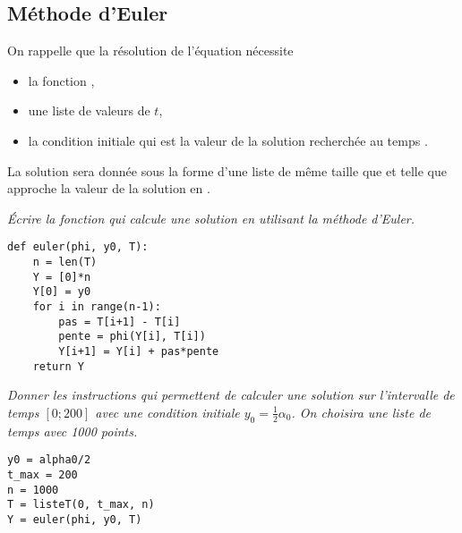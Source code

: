 \subsection{Méthode d'Euler} 
On rappelle que la résolution de l'équation nécessite
\begin{itemize}
    \item la fonction ,
    \item une liste  de valeurs de $t$,
    \item la condition initiale  qui est la valeur de la solution recherchée au temps .
\end{itemize}
La solution sera donnée sous la forme d'une liste  de même taille que  et telle que  approche la valeur de la solution en .
\begin{Exercise}\it
Écrire la fonction  qui calcule une solution en utilisant la méthode d'Euler.
\end{Exercise}
\begin{Answer}
\begin{lstlisting}
def euler(phi, y0, T):
    n = len(T)
    Y = [0]*n
    Y[0] = y0 
    for i in range(n-1): 
        pas = T[i+1] - T[i]
        pente = phi(Y[i], T[i])  
        Y[i+1] = Y[i] + pas*pente
    return Y
\end{lstlisting}
\end{Answer}
\begin{Exercise}\it
Donner les instructions qui permettent de calculer une solution sur l'intervalle de temps $[0;200]$ avec une condition initiale $y_0 = \frac 12 \alpha_0$. On choisira une liste de temps avec 1000 points.
\end{Exercise}
\begin{Answer}
\begin{lstlisting}
y0 = alpha0/2
t_max = 200
n = 1000
T = listeT(0, t_max, n)
Y = euler(phi, y0, T)
\end{lstlisting}
\end{Answer}
